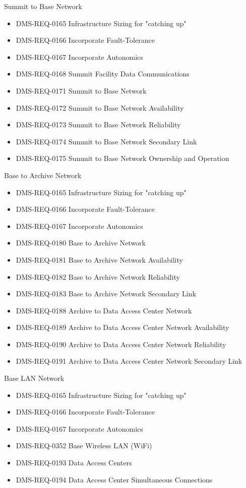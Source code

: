 Summit to Base Network \begin{itemize}
\item DMS-REQ-0165 Infrastructure Sizing for "catching up"
\item DMS-REQ-0166 Incorporate Fault-Tolerance
\item DMS-REQ-0167 Incorporate Autonomics
\item DMS-REQ-0168 Summit Facility Data Communications
\item DMS-REQ-0171 Summit to Base Network
\item DMS-REQ-0172 Summit to Base Network Availability
\item DMS-REQ-0173 Summit to Base Network Reliability
\item DMS-REQ-0174 Summit to Base Network Secondary Link
\item DMS-REQ-0175 Summit to Base Network Ownership and Operation
\end{itemize}
Base to Archive Network \begin{itemize}
\item DMS-REQ-0165 Infrastructure Sizing for "catching up"
\item DMS-REQ-0166 Incorporate Fault-Tolerance
\item DMS-REQ-0167 Incorporate Autonomics
\item DMS-REQ-0180 Base to Archive Network
\item DMS-REQ-0181 Base to Archive Network Availability
\item DMS-REQ-0182 Base to Archive Network Reliability
\item DMS-REQ-0183 Base to Archive Network Secondary Link
\item DMS-REQ-0188 Archive to Data Access Center Network
\item DMS-REQ-0189 Archive to Data Access Center Network Availability
\item DMS-REQ-0190 Archive to Data Access Center Network Reliability
\item DMS-REQ-0191 Archive to Data Access Center Network Secondary Link
\end{itemize}
Base LAN Network \begin{itemize}
\item DMS-REQ-0165 Infrastructure Sizing for "catching up"
\item DMS-REQ-0166 Incorporate Fault-Tolerance
\item DMS-REQ-0167 Incorporate Autonomics
\item DMS-REQ-0352 Base Wireless LAN (WiFi)
\item DMS-REQ-0193 Data Access Centers
\item DMS-REQ-0194 Data Access Center Simultaneous Connections
\end{itemize}

